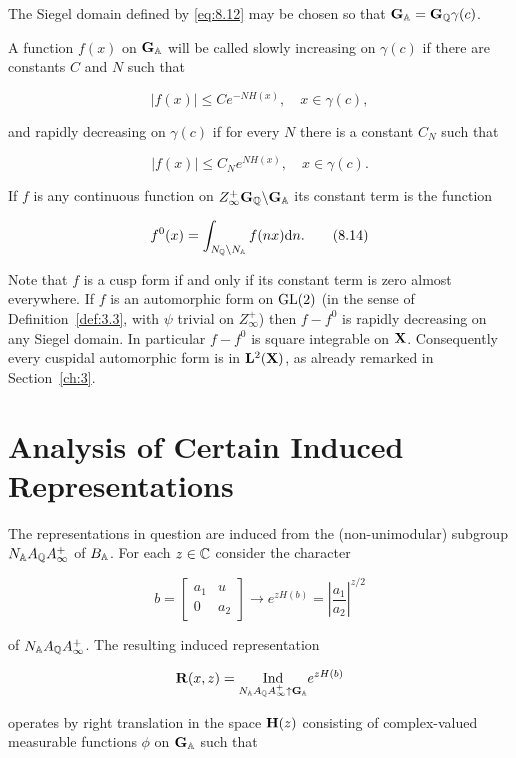 The Siegel domain defined by \eqref{eq:8.12} may be chosen so that $\mathbf{G}_{\mathbb{A}} = \mathbf{G}_{\mathbb{Q}}\gamma(c)$.

A function $f(x)$ on $\mathbf{G}_{\mathbb{A}}$ will be called slowly increasing on $\gamma(c)$ if there are constants $C$ and $N$ such that

\[
|f(x)| \leq Ce^{-NH(x)}, \quad x \in \gamma(c),
\]

and rapidly decreasing on $\gamma(c)$ if for every $N$ there is a constant $C_{N}$ such that

\[
|f(x)| \leq C_{N}e^{NH(x)}, \quad x \in \gamma(c).
\]

If $f$ is any continuous function on $Z_{\infty}^{+}\mathbf{G}_{\mathbb{Q}}\backslash\mathbf{G}_{\mathbb{A}}$ its constant term is the function

\begin{equation}\label{eq:8.14}
f^{0}(x) = \int_{N_{\mathbb{Q}}\backslash N_{\mathbb{A}}} f(nx) \mathrm{d} n.\tag{8.14}
\end{equation}

Note that $f$ is a cusp form if and only if its constant term is zero almost everywhere. If $f$ is an automorphic form on $\operatorname{GL}(2)$ (in the sense of Definition~\ref{def:3.3}, with $\psi$ trivial on $Z_{\infty}^{+}$) then $f - f^{0}$ is rapidly decreasing on any Siegel domain. In particular $f - f^{0}$ is square integrable on $\mathbf{X}$. Consequently every cuspidal automorphic form is in $\mathbf{L}^{2}(\mathbf{X})$, as already remarked in Section~\ref{ch:3}.

\section{Analysis of Certain Induced Representations}\label{sec:8b}

The representations in question are induced from the (non-unimodular) subgroup $N_{\mathbb{A}}A_{\mathbb{Q}}A_{\infty}^{+}$ of $B_{\mathbb{A}}$. For each $z \in \mathbb{C}$ consider the character

\[
b = \begin{bmatrix} a_{1} & u \\ 0 & a_{2} \end{bmatrix} \to e^{zH(b)} = \left|\frac{a_{1}}{a_{2}}\right|^{z/2}
\]

of $N_{\mathbb{A}}A_{\mathbb{Q}}A_{\infty}^{+}$. The resulting induced representation

\[
\mathbf{R}(x,z) = \underset{N_{\mathbb{A}}A_{\mathbb{Q}}A_{\infty}^{+} \uparrow \mathbf{G}_{\mathbb{A}}}{\operatorname{Ind}} e^{zH(b)}
\]

operates by right translation in the space $\mathbf{H}(z)$ consisting of complex-valued measurable functions $\phi$ on $\mathbf{G}_{\mathbb{A}}$ such that

